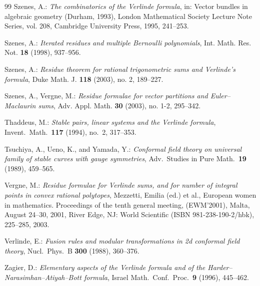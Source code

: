 \documentclass[11pt,reqno]{amsart}
\theoremstyle{remark}
\begin{document}
\begin{thebibliography}{99}
 Szenes, A.: \emph{The combinatorics of the Verlinde
formula}, in: Vector bundles in algebraic geometry (Durham, 1993), London
Mathematical Society Lecture Note Series, vol. 208, Cambridge University Press,
1995, 241--253.

 Szenes, A.: \emph{Iterated residues and multiple Bernoulli
polynomials}, Int. Math. Res. Not. \textbf{18} (1998), 937--956.

 Szenes, A.: \emph{Residue theorem for rational
trigonometric sums and Verlinde's formula}, Duke Math. J. \textbf{118} (2003),
no. 2, 189--227.

 Szenes, A., Vergne, M.: \emph{Residue formulae for vector
partitions and Euler--Maclaurin sums}, Adv. Appl. Math. \textbf{30} (2003),
no. 1-2, 295--342.

 Thaddeus, M.: \emph{Stable pairs, linear systems and
the Verlinde formula}, Invent.\ Math.\ \textbf{117} (1994), no.\ 2, 317--353.

 Tsuchiya, A., Ueno, K., and Yamada, Y.: \emph{Conformal
field theory on universal family of stable curves with gauge symmetries},
Adv.\ Studies in Pure Math.\ \textbf{19} (1989), 459--565.

 Vergne, M.: \emph{Residue formulae for Verlinde sums, and for number of integral points in convex rational polytopes}, Mezzetti, Emilia (ed.) et al., European women in mathematics. Proceedings of the tenth general meeting, (EWM’2001), Malta, August 24–30, 2001, River Edge, NJ: World Scientific (ISBN 981-238-190-2/hbk), 225--285, 2003.

 Verlinde, E.: \emph{Fusion rules and modular
transformations in 2d conformal field theory}, Nucl.\ Phys.\ B \textbf{300}
(1988), 360--376.




 Zagier, D.: \emph{Elementary aspects of the Verlinde
formula and of the Harder--Narasimhan--Atiyah--Bott formula}, Israel Math.\
Conf.\ Proc.\ \textbf{9} (1996), 445--462.

\end{thebibliography}
\end{document}
